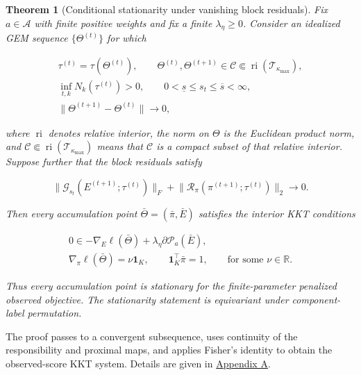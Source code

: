 \documentclass[preprint,12pt,authoryear]{elsarticle}
\newtheorem{theorem}{Theorem}
\begin{document}
\begin{theorem}[Conditional stationarity under vanishing block residuals]
\label{thm:idealized-gem}
Fix $a\in\mathcal A$ with finite positive weights and fix a finite
$\lambda_\eta\geq0$.
Consider an idealized GEM sequence
$\{\Theta^{(t)}\}$ for which

\begin{equation}
\label{eq:stationarity-assumptions}
\begin{gathered}
\tau^{(t)}=\tau(\Theta^{(t)}),
\qquad
\Theta^{(t)},\Theta^{(t+1)}
\in\mathcal C\Subset\operatorname{ri}(\mathcal T_{\kappa_{\max}}),\\
\inf_{t,k}N_k(\tau^{(t)})>0,
\qquad
0<\underline s\leq s_t\leq\overline s<\infty,\\
\lVert\Theta^{(t+1)}-\Theta^{(t)}\rVert\longrightarrow0,
\end{gathered}
\end{equation}

where $\operatorname{ri}$ denotes relative interior, the norm on $\Theta$ is
the Euclidean product norm, and
$\mathcal C\Subset\operatorname{ri}(\mathcal T_{\kappa_{\max}})$ means that
$\mathcal C$ is a compact subset of that relative interior. Suppose further
that the block residuals satisfy

\begin{equation}
\label{eq:vanishing-block-residuals}
\lVert\mathcal G_{s_t}(E^{(t+1)};\tau^{(t)})\rVert_F
+\lVert\mathcal R_\pi(\pi^{(t+1)};\tau^{(t)})\rVert_2
\longrightarrow0.
\end{equation}

Then every accumulation point $\bar\Theta=(\bar\pi,\bar E)$ satisfies the
interior KKT conditions

\begin{equation}
\label{eq:kkt-stationarity}
\begin{gathered}
0\in-\nabla_E\ell(\bar\Theta)
+\lambda_\eta\partial\mathcal P_a(\bar E),\\
\nabla_\pi\ell(\bar\Theta)
=\nu\mathbf1_K,
\qquad
\mathbf1_K^\top\bar\pi=1,
\qquad \text{for some }\nu\in\mathbb R.
\end{gathered}
\end{equation}

Thus every accumulation point is stationary for the finite-parameter
penalized observed objective. The stationarity statement is equivariant under
component-label permutation.
\end{theorem}

The proof passes to a convergent subsequence, uses continuity of the
responsibility and proximal maps, and applies Fisher's identity to obtain the
observed-score KKT system. Details are given in
\hyperref[app:proofs]{Appendix A}.
\end{document}
